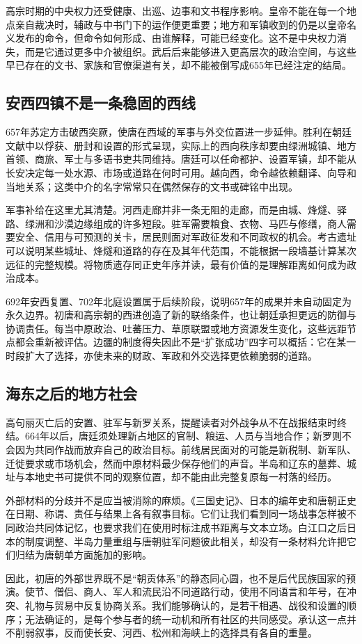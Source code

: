高宗时期的中央权力还受健康、出巡、边事和文书程序影响。皇帝不能在每一个地点亲自裁决时，辅政与中书门下的运作便更重要；地方和军镇收到的仍是以皇帝名义发布的命令，但命令如何形成、由谁解释，可能已经变化。这不是中央权力消失，而是它通过更多中介被组织。武后后来能够进入更高层次的政治空间，与这些早已存在的文书、家族和官僚渠道有关，却不能被倒写成655年已经注定的结局。

\subsection{安西四镇不是一条稳固的西线}
657年苏定方击破西突厥，使唐在西域的军事与外交位置进一步延伸。胜利在朝廷文献中以俘获、册封和设置的形式呈现，实际上的西向秩序却要由绿洲城镇、地方首领、商旅、军士与多语书吏共同维持。唐廷可以任命都护、设置军镇，却不能从长安决定每一处水源、市场或道路在何时可用。越向西，命令越依赖翻译、向导和当地关系；这类中介的名字常常只在偶然保存的文书或碑铭中出现。

军事补给在这里尤其清楚。河西走廊并非一条无阻的走廊，而是由城、烽燧、驿路、绿洲和沙漠边缘组成的许多短段。驻军需要粮食、衣物、马匹与修缮，商人需要安全、信用与可预测的关卡，居民则面对军政征发和不同政权的机会。考古遗址可以说明某些城址、烽燧和道路的存在及其年代范围，不能根据一段墙基计算某次远征的完整规模。将物质遗存同正史年序并读，最有价值的是理解距离如何成为政治成本。

692年安西复置、702年北庭设置属于后续阶段，说明657年的成果并未自动固定为永久边界。初唐和高宗朝的西进创造了新的联络条件，也让朝廷承担更远的防御与协调责任。每当中原政治、吐蕃压力、草原联盟或地方资源发生变化，这些远距节点都会重新被评估。边疆的制度得失因此不是“扩张成功”四字可以概括：它在某一时段扩大了选择，亦使未来的财政、军政和外交选择更依赖脆弱的道路。

\subsection{海东之后的地方社会}
高句丽灭亡后的安置、驻军与新罗关系，提醒读者对外战争从不在战报结束时终结。664年以后，唐廷须处理新占地区的官制、粮运、人员与当地合作；新罗则不会因为共同作战而放弃自己的政治目标。前线居民面对的可能是新税制、新军队、迁徙要求或市场机会，然而中原材料最少保存他们的声音。半岛和辽东的墓葬、城址与本地史书可提供不同的观察位置，却不能由此完整复原每一村落的经历。

外部材料的分歧并不是应当被消除的麻烦。《三国史记》、日本的编年史和唐朝正史在日期、称谓、责任与结果上各有叙事目标。它们让我们看到同一场战事怎样被不同政治共同体记忆，也要求我们在使用时标注成书距离与文本立场。白江口之后日本的制度调整、半岛力量重组与唐朝驻军问题彼此相关，却没有一条材料允许把它们归结为唐朝单方面施加的影响。

因此，初唐的外部世界既不是“朝贡体系”的静态同心圆，也不是后代民族国家的预演。使节、僧侣、商人、军人和流民沿不同道路行动，使用不同语言和年号，在冲突、礼物与贸易中反复协商关系。我们能够确认的，是若干相遇、战役和设置的顺序；无法确证的，是每个参与者的统一动机和所有社区的共同感受。承认这一点并不削弱叙事，反而使长安、河西、松州和海峡上的选择具有各自的重量。

